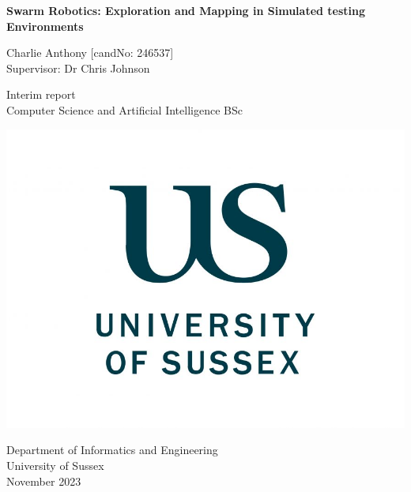 \documentclass[12pt]{article}
\begin{document}
\begin{titlepage}
    \centering
    \vspace*{5cm}

    \Large
    \textbf{Swarm Robotics: Exploration and Mapping in Simulated testing Environments}

    \vspace{1cm}

    Charlie Anthony [candNo: 246537]\\
    Supervisor: Dr Chris Johnson



    \vfill

    \vspace{1cm}

    \small
    Interim report\\
    Computer Science and Artificial Intelligence BSc

    \includegraphics[width=0.3\linewidth]{sussex_logo.jpg} %


    \small
    Department of Informatics and Engineering\\
    University of Sussex\\
    November 2023
\end{titlepage}

\tableofcontents
\newpage

\end{document}
